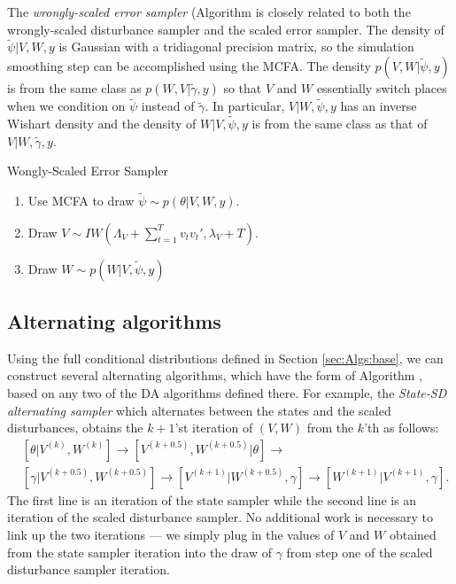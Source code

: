 \documentclass[12pt]{article}
\begin{document}
The {\it wrongly-scaled error sampler} (Algorithm  is closely related to both the wrongly-scaled disturbance sampler and the scaled error sampler. The density of $\tilde{\psi}|V,W,y$ is Gaussian with a tridiagonal precision matrix, so the simulation smoothing step can be accomplished using the MCFA. The density $p(V,W|\tilde{\psi},y)$ is from the same class as $p(W,V|\tilde{\gamma},y)$ so that $V$ and $W$ essentially switch places when we condition on $\tilde{\psi}$ instead of $\tilde{\gamma}$. In particular, $V|W,\tilde{\psi},y$ has an inverse Wishart density and the density of $W|V,\tilde{\psi},y$ is from the same class as that of $V|W,\tilde{\gamma},y$.
\begin{alg*}[WSE]Wongly-Scaled Error Sampler\label{alg:DLMwerror}
\begin{enumerate}
\item Use MCFA to draw $\tilde{\psi} \sim p(\theta|V,W,y)$.
\item Draw $V \sim IW\left(\Lambda_V + \sum_{t=1}^Tv_tv_t',\lambda_V + T\right)$.
\item Draw $W \sim p(W|V,\tilde{\psi},y)$
\end{enumerate}
\end{alg*}


\subsection{Alternating algorithms}\label{sec:Algs:alt}
Using the full conditional distributions defined in Section \ref{sec:Algs:base}, we can construct several alternating algorithms, which have the form of Algorithm , based on any two of the DA algorithms defined there. For example, the {\it State-SD alternating sampler} which alternates between the states and the scaled disturbances, obtains the $k+1$'st iteration of $(V,W)$ from the $k$'th as follows:
\begin{align*}
&[\theta|V^{(k)},W^{(k)}] \to [V^{(k+0.5)},W^{(k+0.5)}|\theta] \to\\
&[\gamma|V^{(k+0.5)},W^{(k+0.5)}] \to [V^{(k+1)}|W^{(k+0.5)},\gamma] \to [W^{(k+1)}|V^{(k+1)},\gamma].
\end{align*}
The first line is an iteration of the state sampler while the second line is an iteration of the scaled disturbance sampler. No additional work is necessary to link up the two iterations --- we simply plug in the values of $V$ and $W$ obtained from the state sampler iteration into the draw of $\gamma$ from step one of the scaled disturbance sampler iteration.
\end{document}

